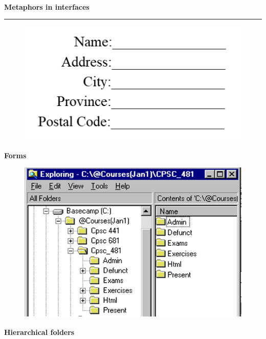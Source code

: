 \documentclass[pdf]{beamer}
\begin{document}
\begin{frame}
    \vspace{198px}
    \hspace{25px}\fontsize{8pt}{5pt}\selectfont{\color{black}{spreadsheet (actuary sheet)}} \\
\end{frame}
  
  
  
\begin{frame}
{\textbf{Metaphors in interfaces}}{\textcolor{red}{\rule{12cm}{1.2pt}}}

\begin{figure}
\includegraphics[scale=0.45]{3_Picture3.png}
\end{figure}

\begin{center}
\textbf{Forms}
\end{center}

\begin{figure}
\includegraphics[scale=0.45]{3_Picture1.png}
\end{figure}

\begin{center}
\textbf{Hierarchical folders}
\end{center}
    
\vspace{50px}
\end{frame}
\end{document}
